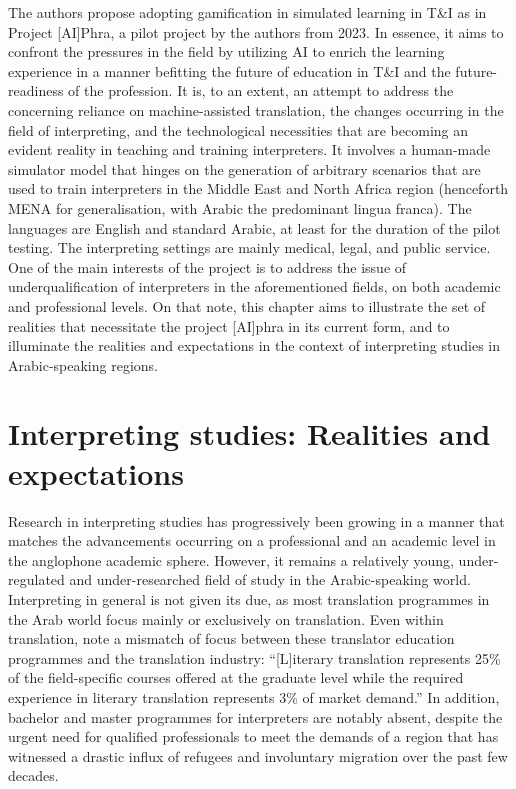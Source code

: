 \documentclass[output=paper]{langscibook}
\begin{document}
The authors propose adopting gamification in simulated learning in T\&I as in Project [AI]Phra, a pilot project by the authors from 2023. In essence, it aims to confront the pressures in the field by utilizing AI to enrich the learning experience in a manner befitting the future of education in T\&I and the future-readiness of the profession. It is, to an extent, an attempt to address the concerning reliance on machine-assisted translation, the changes occurring in the field of interpreting, and the technological necessities that are becoming an evident reality in teaching and training interpreters. It involves a human-made simulator model that hinges on the generation of arbitrary scenarios that are used to train interpreters in the Middle East and North Africa region (henceforth MENA for generalisation, with Arabic the predominant lingua franca). The languages are English and standard Arabic, at least for the duration of the pilot testing. The interpreting settings are mainly medical, legal, and public service. One of the main interests of the project is to address the issue of underqualification of interpreters in the aforementioned fields, on both academic and professional levels. On that note, this chapter aims to illustrate the set of realities that necessitate the project [AI]phra in its current form, and to illuminate the realities and expectations in the context of interpreting studies in Arabic-speaking regions. 

\section{Interpreting studies: Realities and expectations}

Research in interpreting studies has progressively been growing in a manner that matches the advancements occurring on a professional and an academic level in the anglophone academic sphere. However, it remains a relatively young, under-regulated and under-researched field of study in the Arabic-speaking world. Interpreting in general is not given its due, as most translation programmes in the Arab world focus mainly or exclusively on translation. Even within translation, \citet[198]{al2017translator} note a mismatch of focus between these translator education programmes and the translation industry: “[L]iterary translation represents 25\% of the field-specific courses offered at the graduate level while the required experience in literary translation represents 3\% of market demand.” In addition, bachelor and master programmes for interpreters are notably absent, despite the urgent need for qualified professionals to meet the demands of a region that has witnessed a drastic influx of refugees and involuntary migration over the past few decades.
\end{document}
